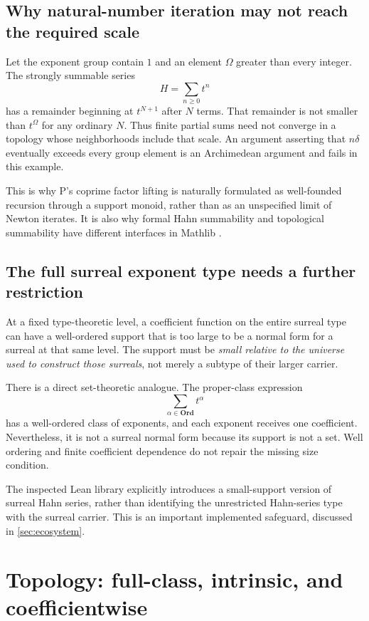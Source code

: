 \documentclass[11pt,letterpaper]{article}
\numberwithin{equation}{section}
\theoremstyle{definition}
\theoremstyle{remark}
\newcommand{\Ord}{\mathbf{Ord}}
\begin{document}
\subsection{Why natural-number iteration may not reach the required scale}
Let the exponent group contain $1$ and an element $\Omega$ greater than every integer. The strongly summable series
\[
H=\sum_{n\ge0}t^n
\]
has a remainder beginning at $t^{N+1}$ after $N$ terms. That remainder is not smaller than $t^\Omega$ for any ordinary $N$. Thus finite partial sums need not converge in a topology whose neighborhoods include that scale. An argument asserting that $n\delta$ eventually exceeds every group element is an Archimedean argument and fails in this example.

This is why P's coprime factor lifting is naturally formulated as well-founded recursion through a support monoid, rather than as an unspecified limit of Newton iterates. It is also why formal Hahn summability and topological summability have different interfaces in Mathlib \cite{HahnSummable}.

\subsection{The full surreal exponent type needs a further restriction}
At a fixed type-theoretic level, a coefficient function on the entire surreal type can have a well-ordered support that is too large to be a normal form for a surreal at that same level. The support must be \emph{small relative to the universe used to construct those surreals}, not merely a subtype of their larger carrier.

There is a direct set-theoretic analogue. The proper-class expression
\[
\sum_{\alpha\in\Ord}t^\alpha
\]
has a well-ordered class of exponents, and each exponent receives one coefficient. Nevertheless, it is not a surreal normal form because its support is not a set. Well ordering and finite coefficient dependence do not repair the missing size condition.

The inspected Lean library explicitly introduces a small-support version of surreal Hahn series, rather than identifying the unrestricted Hahn-series type with the surreal carrier. This is an important implemented safeguard, discussed in \cref{sec:ecosystem}.

\section{Topology: full-class, intrinsic, and coefficientwise}\label{sec:topology}
\end{document}
